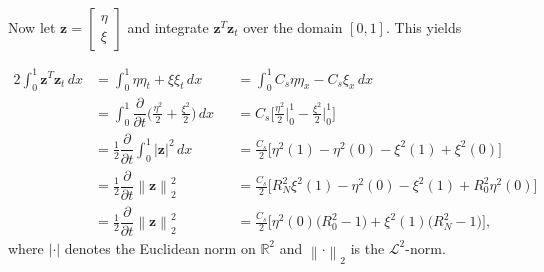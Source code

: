 \documentclass[12pt]{article}
\newcommand{\norm}[1]{\left\lVert#1\right\rVert}
\begin{document}
\begin{flushleft}
Now let $\mathbf{z} = \begin{bmatrix}
\eta\\
\xi
\end{bmatrix}$ and integrate $\mathbf{z}^T \mathbf{z}_t$ over the domain $[0,1]$. This yields

\begin{alignat*}{2}
\int_0^1 \mathbf{z}^{T} \mathbf{z}_t \, dx & = \int_0^1 \eta \eta_t + \xi \xi_t \, dx && = \int_0^1 C_s \eta \eta_x - C_s \xi_x \, dx\\
& = \int_0^1 \dfrac{\partial}{\partial t} \bigg ( \frac{\eta^2}{2} + \frac{\xi^2}{2} \bigg ) \, dx && = C_s \bigg [ \frac{\eta^2}{2} \bigg |_0^1 - \frac{\xi^2}{2} \bigg |_0^1  \bigg ]\\
&= \frac{1}{2} \dfrac{\partial}{\partial t} \int_0^1 |\mathbf{z}|^2 \, dx && = \frac{C_s}{2} \bigg [\eta^2(1)-\eta^2(0) -\xi^2(1) + \xi^2(0) \bigg ]\\
& = \frac{1}{2} \dfrac{\partial}{\partial t} \norm{\mathbf{z}}_2^2 && = \frac{C_s}{2} \bigg [ R_N^2 \xi^2(1) - \eta^2(0) - \xi^2(1) + R_0^2\eta^2(0) \bigg ]\\
& = \frac{1}{2} \dfrac{\partial}{\partial t} \norm{\mathbf{z}}_2^2 && = \frac{C_s}{2} \bigg [\eta^2(0) \big (R_0^2 - 1 \big ) + \xi^2(1) \big ( R_N^2 - 1 \big )    \bigg ],
\end{alignat*}
where $|\cdot |$ denotes the Euclidean norm on $\mathbb{R}^2$ and $ \norm{\cdot}_2 $ is the $\mathcal{L}^2$-norm.
\end{flushleft}
\end{document}
